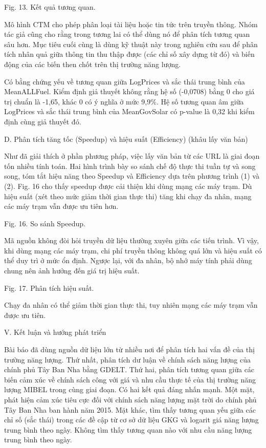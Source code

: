Fig. 13. Kết quả tương quan.

Mô hình CTM cho phép phân loại tài liệu hoặc tin tức trên truyền thông. Nhóm tác giả cũng cho rằng trong tương lai có thể dùng nó để phân tích tương quan sâu hơn. Mục tiêu cuối cùng là dùng kỹ thuật này trong nghiên cứu sau để phân tích nhân quả giữa thông tin thu thập được (các chỉ số xây dựng từ đó) và biến động của các biến then chốt trên thị trường năng lượng.

Có bằng chứng yếu về tương quan giữa LogPrices và sắc thái trung bình của MeanALLFuel. Kiểm định giả thuyết không rằng hệ số (-0,0708) bằng 0 cho giá trị chuẩn là -1,65, khác 0 có ý nghĩa ở mức 9,9\%. Hệ số tương quan âm giữa LogPrices và sắc thái trung bình của MeanGovSolar có p-value là 0,32 khi kiểm định cùng giả thuyết đó.

D. Phân tích tăng tốc (Speedup) và hiệu suất (Efficiency) (khâu lấy văn bản)

Như đã giải thích ở phần phương pháp, việc lấy văn bản từ các URL là giai đoạn tốn nhiều tính toán. Hai hình trình bày so sánh chế độ thực thi tuần tự và song song, tóm tắt hiệu năng theo Speedup và Efficiency dựa trên phương trình (1) và (2). Fig. 16 cho thấy speedup được cải thiện khi dùng mạng các máy trạm. Dù hiệu suất (xét theo mức giảm thời gian thực thi) tăng khi chạy đa nhân, mạng các máy trạm vẫn được ưu tiên hơn.

Fig. 16. So sánh Speedup.

Mã nguồn không đòi hỏi truyền dữ liệu thường xuyên giữa các tiến trình. Vì vậy, khi dùng mạng các máy trạm, chi phí truyền thông không quá lớn và hiệu suất có thể duy trì ở mức ổn định. Ngược lại, với đa nhân, bộ nhớ máy tính phải dùng chung nên ảnh hưởng đến giá trị hiệu suất.

Fig. 17. Phân tích hiệu suất.

Chạy đa nhân có thể giảm thời gian thực thi, tuy nhiên mạng các máy trạm vẫn được ưu tiên.

V. Kết luận và hướng phát triển

Bài báo đã dùng nguồn dữ liệu lớn từ nhiều nơi để phân tích hai vấn đề của thị trường năng lượng. Thứ nhất, phân tích dư luận về chính sách năng lượng của chính phủ Tây Ban Nha bằng GDELT. Thứ hai, phân tích tương quan giữa các biến cảm xúc về chính sách công với giá và nhu cầu thực tế của thị trường năng lượng MIBEL trong cùng giai đoạn. Có hai kết quả đáng nhấn mạnh. Một mặt, phát hiện cảm xúc tiêu cực đối với chính sách năng lượng mặt trời do chính phủ Tây Ban Nha ban hành năm 2015. Mặt khác, tìm thấy tương quan yếu giữa các chỉ số (sắc thái) trong các đề cập từ cơ sở dữ liệu GKG và logarit giá năng lượng trung bình theo ngày. Không tìm thấy tương quan nào với nhu cầu năng lượng trung bình theo ngày.


